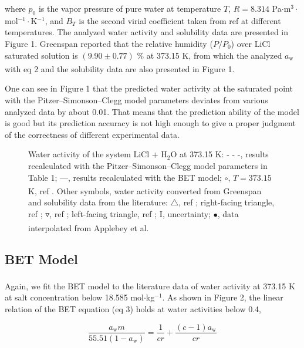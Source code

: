 \documentclass[11pt]{article}
\newcommand{\rc}[1]{\textsuperscript{\citenum{#1}}}
\begin{document}
where $p_0$ is the vapor pressure of pure water at temperature $T$,
$R = 8.314$ Pa$\cdot$m$^3\cdot$mol$^{-1}\cdot$K$^{-1}$, and $B_T$ is the
second virial coefficient taken from ref  at different
temperatures. The analyzed water activity and solubility data are presented in
Figure 1. Greenspan reported that the relative humidity ($P/P_0$) over LiCl
saturated solution is $(9.90 \pm 0.77)$ \% at 373.15 K, from which the
analyzed $a_{\mathrm{w}}$ with eq 2 and the solubility
data\rc{ref1,ref3,ref4,ref5} are also presented in Figure 1.

One can see in Figure 1 that the predicted water activity at the saturated
point with the Pitzer--Simonson--Clegg model parameters deviates from various
analyzed data by about 0.01. That means that the prediction ability of the
model is good but its prediction accuracy is not high enough to give a proper
judgment of the correctness of different experimental data.

\begin{figure}[htbp]
\centering
\caption{Water activity of the system LiCl + H$_2$O at 373.15 K:
- - -, results recalculated with the Pitzer--Simonson--Clegg model parameters
in Table 1; ---, results recalculated with the BET model; $\circ$,
$T = 373.15$ K, ref . Other symbols, water activity converted
from Greenspan\rc{ref16} and solubility data from the literature:
$\triangle$, ref ; right-facing triangle, ref ;
$\triangledown$, ref ; left-facing triangle,
ref ; I, uncertainty; $\bullet$, data interpolated from
Applebey et al.\rc{ref11}}
\end{figure}

\subsection*{BET Model}

Again, we fit the BET model\rc{ref20} to the literature data of water activity
at 373.15 K at salt concentration below 18.585 mol$\cdot$kg$^{-1}$. As shown
in Figure 2, the linear relation of the BET equation (eq 3) holds at water
activities below 0.4,

\begin{equation}
\frac{a_{\mathrm{w}} m}{55.51(1 - a_{\mathrm{w}})}
= \frac{1}{cr} + \frac{(c - 1) a_{\mathrm{w}}}{cr}
\end{equation}
\end{document}
